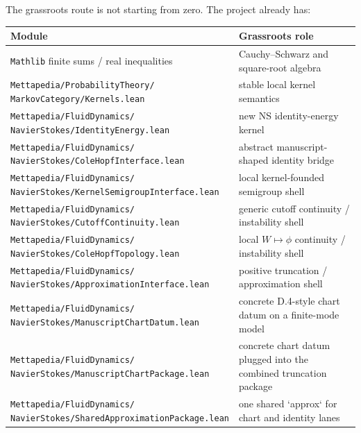 \documentclass[11pt]{article}
\theoremstyle{remark}
\begin{document}
The grassroots route is not starting from zero.  The project already has:
\begin{center}
\begin{tabular}{p{}p{}}
\toprule
\textbf{Module} & \textbf{Grassroots role} \\
\midrule
\texttt{Mathlib} finite sums / real inequalities & Cauchy--Schwarz and square-root algebra \\
\shortstack[l]{\texttt{Mettapedia/ProbabilityTheory/}\\\texttt{MarkovCategory/Kernels.lean}} & stable local kernel semantics \\
\shortstack[l]{\texttt{Mettapedia/FluidDynamics/}\\\texttt{NavierStokes/IdentityEnergy.lean}} & new NS identity-energy kernel \\
\shortstack[l]{\texttt{Mettapedia/FluidDynamics/}\\\texttt{NavierStokes/ColeHopfInterface.lean}} & abstract manuscript-shaped identity bridge \\
\shortstack[l]{\texttt{Mettapedia/FluidDynamics/}\\\texttt{NavierStokes/KernelSemigroupInterface.lean}} & local kernel-founded semigroup shell \\
\shortstack[l]{\texttt{Mettapedia/FluidDynamics/}\\\texttt{NavierStokes/CutoffContinuity.lean}} & generic cutoff continuity / instability shell \\
\shortstack[l]{\texttt{Mettapedia/FluidDynamics/}\\\texttt{NavierStokes/ColeHopfTopology.lean}} & local \(W \mapsto \phi\) continuity / instability shell \\
\shortstack[l]{\texttt{Mettapedia/FluidDynamics/}\\\texttt{NavierStokes/ApproximationInterface.lean}} & positive truncation / approximation shell \\
\shortstack[l]{\texttt{Mettapedia/FluidDynamics/}\\\texttt{NavierStokes/ManuscriptChartDatum.lean}} & concrete D.4-style chart datum on a finite-mode model \\
\shortstack[l]{\texttt{Mettapedia/FluidDynamics/}\\\texttt{NavierStokes/ManuscriptChartPackage.lean}} & concrete chart datum plugged into the combined truncation package \\
\shortstack[l]{\texttt{Mettapedia/FluidDynamics/}\\\texttt{NavierStokes/SharedApproximationPackage.lean}} & one shared `approx` for chart and identity lanes \\

\end{tabular}
\end{center}
\end{document}
